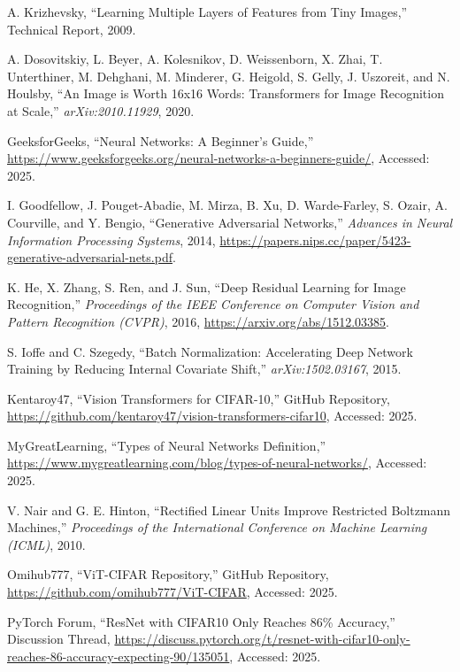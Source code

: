 \documentclass[UTF8]{report}
\theoremstyle{MyLineTheoremStyle} %
\theoremstyle{MyBlockTheoremStyle} %
\theoremstyle{MySubsubsectionStyle} %
\begin{document}
\begin{thebibliography}{9}

A. Krizhevsky, ``Learning Multiple Layers of Features from Tiny Images,'' Technical Report, 2009.

A. Dosovitskiy, L. Beyer, A. Kolesnikov, D. Weissenborn, X. Zhai, T. Unterthiner, M. Dehghani, M. Minderer, G. Heigold, S. Gelly, J. Uszoreit, and N. Houlsby, ``An Image is Worth 16x16 Words: Transformers for Image Recognition at Scale,'' \textit{arXiv:2010.11929}, 2020.

GeeksforGeeks, ``Neural Networks: A Beginner's Guide,'' \url{https://www.geeksforgeeks.org/neural-networks-a-beginners-guide/}, Accessed: 2025.

I. Goodfellow, J. Pouget-Abadie, M. Mirza, B. Xu, D. Warde-Farley, S. Ozair, A. Courville, and Y. Bengio, ``Generative Adversarial Networks,'' \textit{Advances in Neural Information Processing Systems}, 2014, \url{https://papers.nips.cc/paper/5423-generative-adversarial-nets.pdf}.

K. He, X. Zhang, S. Ren, and J. Sun, ``Deep Residual Learning for Image Recognition,'' \textit{Proceedings of the IEEE Conference on Computer Vision and Pattern Recognition (CVPR)}, 2016, \url{https://arxiv.org/abs/1512.03385}.

S. Ioffe and C. Szegedy, ``Batch Normalization: Accelerating Deep Network Training by Reducing Internal Covariate Shift,'' \textit{arXiv:1502.03167}, 2015.

Kentaroy47, ``Vision Transformers for CIFAR-10,'' GitHub Repository, \url{https://github.com/kentaroy47/vision-transformers-cifar10}, Accessed: 2025.

MyGreatLearning, ``Types of Neural Networks Definition,'' \url{https://www.mygreatlearning.com/blog/types-of-neural-networks/}, Accessed: 2025.

V. Nair and G. E. Hinton, ``Rectified Linear Units Improve Restricted Boltzmann Machines,'' \textit{Proceedings of the International Conference on Machine Learning (ICML)}, 2010.

Omihub777, ``ViT-CIFAR Repository,'' GitHub Repository, \url{https://github.com/omihub777/ViT-CIFAR}, Accessed: 2025.

PyTorch Forum, ``ResNet with CIFAR10 Only Reaches 86\% Accuracy,'' Discussion Thread, \url{https://discuss.pytorch.org/t/resnet-with-cifar10-only-reaches-86-accuracy-expecting-90/135051}, Accessed: 2025.


\end{thebibliography}
\end{document}
